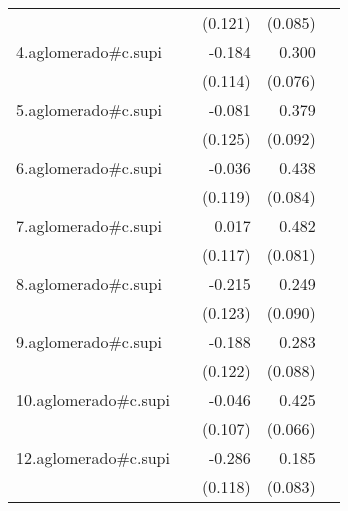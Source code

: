 {\begin{longtable}{l*{4}{D{.}{.}{-1}}}
            &                     &     (0.121)         &     (0.085)         &                     \\
\addlinespace
4.aglomerado#c.supi&                     &      -0.184         &       0.300\sym{***}&                     \\
            &                     &     (0.114)         &     (0.076)         &                     \\
\addlinespace
5.aglomerado#c.supi&                     &      -0.081         &       0.379\sym{***}&                     \\
            &                     &     (0.125)         &     (0.092)         &                     \\
\addlinespace
6.aglomerado#c.supi&                     &      -0.036         &       0.438\sym{***}&                     \\
            &                     &     (0.119)         &     (0.084)         &                     \\
\addlinespace
7.aglomerado#c.supi&                     &       0.017         &       0.482\sym{***}&                     \\
            &                     &     (0.117)         &     (0.081)         &                     \\
\addlinespace
8.aglomerado#c.supi&                     &      -0.215         &       0.249\sym{**} &                     \\
            &                     &     (0.123)         &     (0.090)         &                     \\
\addlinespace
9.aglomerado#c.supi&                     &      -0.188         &       0.283\sym{**} &                     \\
            &                     &     (0.122)         &     (0.088)         &                     \\
\addlinespace
10.aglomerado#c.supi&                     &      -0.046         &       0.425\sym{***}&                     \\
            &                     &     (0.107)         &     (0.066)         &                     \\
\addlinespace
12.aglomerado#c.supi&                     &      -0.286\sym{*}  &       0.185\sym{*}  &                     \\
            &                     &     (0.118)         &     (0.083)         &                     \\

\end{longtable}}
